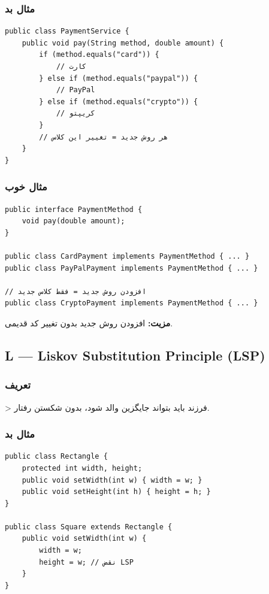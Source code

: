 \documentclass[12pt, a4paper]{article}
\begin{document}
\subsubsection{مثال بد}
\begin{lstlisting}
public class PaymentService {
    public void pay(String method, double amount) {
        if (method.equals("card")) {
            // کارت
        } else if (method.equals("paypal")) {
            // PayPal
        } else if (method.equals("crypto")) {
            // کریپتو
        }
        // هر روش جدید = تغییر این کلاس
    }
}
\end{lstlisting}

\subsubsection{مثال خوب}
\begin{lstlisting}
public interface PaymentMethod {
    void pay(double amount);
}

public class CardPayment implements PaymentMethod { ... }
public class PayPalPayment implements PaymentMethod { ... }

// افزودن روش جدید = فقط کلاس جدید
public class CryptoPayment implements PaymentMethod { ... }
\end{lstlisting}

\textbf{مزیت:} افزودن روش جدید بدون تغییر کد قدیمی.

\subsection{L — Liskov Substitution Principle (LSP)}

\subsubsection{تعریف}
> فرزند باید بتواند جایگزین والد شود، بدون شکستن رفتار.

\subsubsection{مثال بد}
\begin{lstlisting}
public class Rectangle {
    protected int width, height;
    public void setWidth(int w) { width = w; }
    public void setHeight(int h) { height = h; }
}

public class Square extends Rectangle {
    public void setWidth(int w) {
        width = w;
        height = w; // نقض LSP
    }
}
\end{lstlisting}
\end{document}
